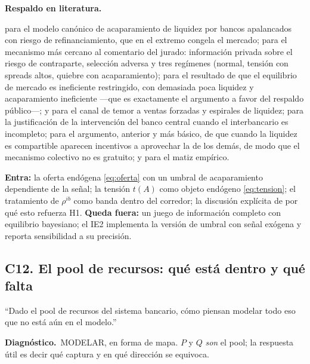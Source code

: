 \documentclass[11pt]{article}
\newcommand{\diag}[1]{\par\noindent\textbf{Diagn\'ostico.}\ #1\par}
\newcommand{\lit}{\par\noindent\textbf{Respaldo en literatura.}\par}
\theoremstyle{definition}
\begin{document}
\lit
\citet{acharyaskeie2011} para el modelo can\'onico de acaparamiento de liquidez por
bancos apalancados con riesgo de refinanciamiento, que en el extremo congela el
mercado; \citet{heider2015} para el mecanismo m\'as cercano al comentario del
jurado: informaci\'on privada sobre el riesgo de contraparte, selecci\'on adversa y
tres reg\'imenes (normal, tensi\'on con spreads altos, quiebre con acaparamiento);
\citet{galeyorulmazer2013} para el resultado de que el equilibrio de mercado es
ineficiente restringido, con demasiada poca liquidez y acaparamiento ineficiente
---que es exactamente el argumento a favor del respaldo p\'ublico---;
\citet{diamondrajan2011} y \citet{brunnermeierpedersen2009} para el canal de temor
a ventas forzadas y espirales de liquidez;
\citet{allencarlettigale2009} para la justificaci\'on de la intervenci\'on del banco
central cuando el interbancario es incompleto;
\citet{bhattacharya1987} para el argumento, anterior y m\'as b\'asico, de que cuando
la liquidez es compartible aparecen incentivos a aprovechar la de los dem\'as, de
modo que el mecanismo colectivo no es gratuito;
\citet{afonso2011stressed} y \citet{ashcraft2011} para el matiz emp\'irico.

\begin{ie2}
\textbf{Entra:} la oferta end\'ogena \eqref{eq:oferta} con un umbral de
acaparamiento dependiente de la se\~nal; la tensi\'on $t(A)$ como objeto
end\'ogeno \eqref{eq:tension}; el tratamiento de $\rho^{ib}$ como banda dentro del
corredor; la discusi\'on expl\'icita de por qu\'e esto refuerza H1.
\textbf{Queda fuera:} un juego de informaci\'on completo con equilibrio bayesiano;
el IE2 implementa la versi\'on de umbral con se\~nal ex\'ogena y reporta
sensibilidad a su precisi\'on.
\end{ie2}

\subsection{C12. El pool de recursos: qu\'e est\'a dentro y qu\'e falta}
\label{sub:C12}

\begin{jurado}
``Dado el pool de recursos del sistema bancario, c\'omo piensan modelar todo eso
que no est\'a a\'un en el modelo.''
\end{jurado}

\diag{MODELAR, en forma de mapa. $P$ y $Q$ \emph{son} el pool; la respuesta \'util
es decir qu\'e captura y en qu\'e direcci\'on se equivoca.}
\end{document}
